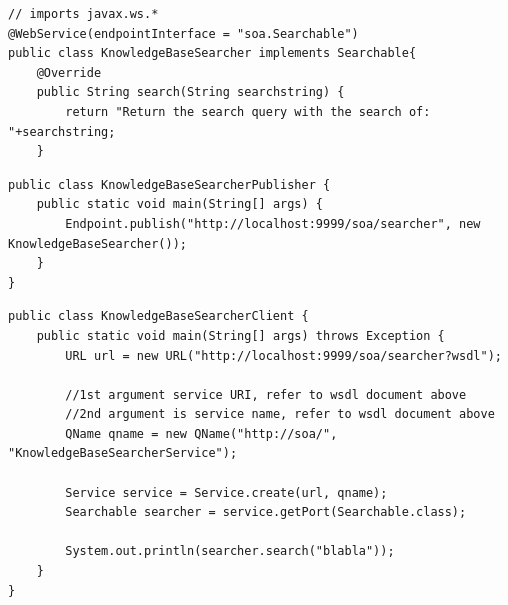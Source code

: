 \documentclass[12pt]{article}
\begin{document}
\begin{lstlisting}[caption=KnowledgeBaseSearcher class, label=KnowledgeBaseSearcher]
// imports javax.ws.*
@WebService(endpointInterface = "soa.Searchable")
public class KnowledgeBaseSearcher implements Searchable{
    @Override
    public String search(String searchstring) {
        return "Return the search query with the search of: "+searchstring;
    }
\end{lstlisting}
\begin{lstlisting}[caption=KnowledgeBaseSearcherPublisher class, label=KnowledgeBaseSearcherPublisher]
public class KnowledgeBaseSearcherPublisher {
    public static void main(String[] args) {
        Endpoint.publish("http://localhost:9999/soa/searcher", new KnowledgeBaseSearcher());
    }
}
\end{lstlisting}
\begin{lstlisting}[caption=KnowledgeBaseSearcherClient class, label=KnowledgeBaseSearcherClient]
public class KnowledgeBaseSearcherClient {
    public static void main(String[] args) throws Exception {
        URL url = new URL("http://localhost:9999/soa/searcher?wsdl");

        //1st argument service URI, refer to wsdl document above
        //2nd argument is service name, refer to wsdl document above
        QName qname = new QName("http://soa/", "KnowledgeBaseSearcherService");

        Service service = Service.create(url, qname);
        Searchable searcher = service.getPort(Searchable.class);

        System.out.println(searcher.search("blabla"));
    }
}
\end{lstlisting}
\end{document}
